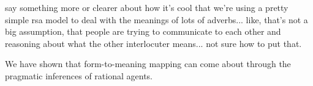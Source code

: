 \documentclass[10pt,letterpaper]{article}
\newcommand{\w}[1]{\emph{#1}}
\newcommand{\todo}[1]{{\color{red}#1}}
\begin{document}
\todo{say something more or clearer about how it's cool that we're using a pretty simple rsa model to deal with the meanings of lots of adverbs... like, that's not a big assumption, that people are trying to communicate to each other and reasoning about what the other interlocuter means... not sure how to put that.}

We have shown that form-to-meaning mapping can come about through the pragmatic inferences of rational agents.



\end{document}
